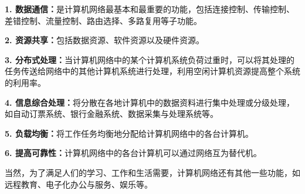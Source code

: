 \textbf{1.
数据通信：}是计算机网络最基本和最重要的功能，包括连接控制、传输控制、差错控制、流量控制、路由选择、多路复用等子功能。

\textbf{2. 资源共享：}包括数据资源、软件资源以及硬件资源。

\textbf{3.
分布式处理：}当计算机网络中的某个计算机系统负荷过重时，可以将其处理的任务传送给网络中的其他计算机系统进行处理，利用空闲计算机资源提高整个系统的利用率。

\textbf{4.
信息综合处理：}将分散在各地计算机中的数据资料进行集中处理或分级处理，如自动订票系统、银行金融系统、数据采集与处理系统等。

\textbf{5. 负载均衡：}将工作任务均衡地分配给计算机网络中的各台计算机。

\textbf{6. 提高可靠性：}计算机网络中的各台计算机可以通过网络互为替代机。

当然，为了满足人们的学习、工作和生活需要，计算机网络还有其他一些功能，如远程教育、电子化办公与服务、娱乐等。
